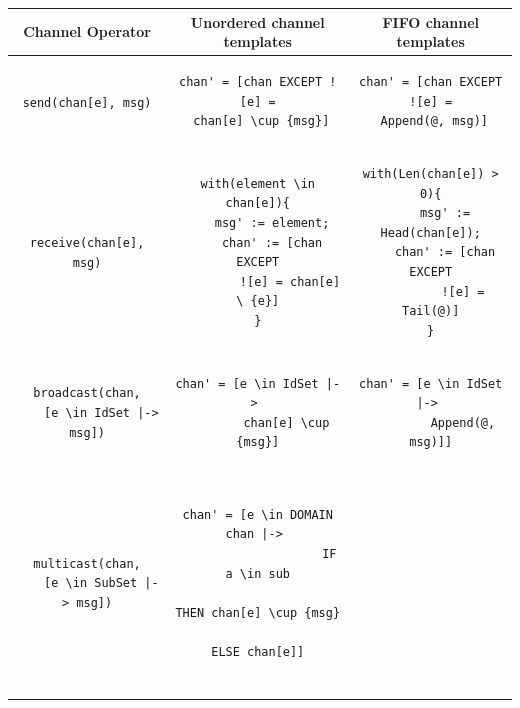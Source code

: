\documentclass{thesul}
\begin{document}
\begin{center}
\begin{tabular}{ | c | c | c | } 
\hline
\textbf{Channel Operator} & \textbf{Unordered channel templates} & \textbf{FIFO channel templates} \\ 
\hline
\verb|send(chan[e], msg)| & 
\begin{lstlisting}[frame=none, numbers=none]
chan' = [chan EXCEPT ![e] =
 chan[e] \cup {msg}]
\end{lstlisting} &
\begin{lstlisting}[frame=none, numbers=none]
chan' = [chan EXCEPT ![e] =
 Append(@, msg)]
\end{lstlisting} \\ 
\hline
\verb|receive(chan[e], msg)| & 
\begin{lstlisting}[frame=none, numbers=none]
with(element \in chan[e]){
	msg' := element;
	chan' := [chan EXCEPT
		 ![e] = chan[e] \ {e}]
}
\end{lstlisting} &

\begin{lstlisting}[frame=none, numbers=none]
with(Len(chan[e]) > 0){
	msg' := Head(chan[e]);
	chan' := [chan EXCEPT
		 ![e] = Tail(@)]
}

\end{lstlisting} \\ 

\hline
\begin{lstlisting}[frame=none, numbers=none]
broadcast(chan,
	[e \in IdSet |-> msg])
\end{lstlisting}
 & 
\begin{lstlisting}[frame=none, numbers=none]
chan' = [e \in IdSet |-> 
		chan[e] \cup {msg}]
\end{lstlisting} &

\begin{lstlisting}[frame=none, numbers=none]
chan' = [e \in IdSet |-> 
		 Append(@, msg)]]

\end{lstlisting} \\ 
\hline
\begin{lstlisting}[frame=none, numbers=none]
multicast(chan,
	[e \in SubSet |-> msg])
\end{lstlisting}
 & 
\begin{lstlisting}[frame=none, numbers=none]

chan' = [e \in DOMAIN chan |-> 
					IF a \in sub
					THEN chan[e] \cup {msg}
					ELSE chan[e]]
					
\end{lstlisting} &


\end{tabular}
\end{center}
\end{document}
